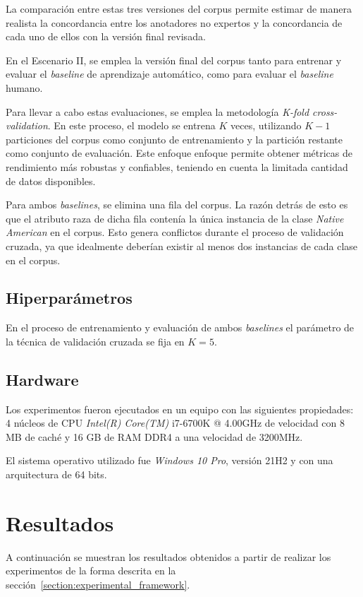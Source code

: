 La comparaci\'on entre estas tres versiones del corpus permite estimar de manera realista la concordancia entre los anotadores 
no expertos y la concordancia de cada uno de ellos con la versi\'on final revisada. 

En el Escenario II, se emplea la versi\'on final del corpus tanto para entrenar y evaluar el \emph{baseline} de aprendizaje 
autom\'atico, como para evaluar el \emph{baseline} humano.

Para llevar a cabo estas evaluaciones, se emplea la 
metodolog\'ia \emph{K-fold cross-validation}. En este proceso, el modelo se entrena $K$ veces, utilizando 
$K-1$ particiones del corpus como conjunto de entrenamiento y la partici\'on restante como conjunto de evaluaci\'on.
Este enfoque enfoque permite obtener m\'etricas de rendimiento m\'as robustas y confiables, teniendo en cuenta 
la limitada cantidad de datos disponibles.

Para ambos \emph{baselines}, se elimina una fila del corpus. La raz\'on detr\'as de esto es que el atributo raza de dicha 
fila conten\'ia la \'unica instancia de la clase \emph{Native American} en el corpus. 
Esto genera conflictos durante el proceso de validaci\'on cruzada, ya que idealmente deber\'ian existir al menos dos 
instancias de cada clase en el corpus.

\subsection{Hiperpar\'ametros}
En el proceso de entrenamiento y evaluaci\'on de ambos \emph{baselines} el par\'ametro de la t\'ecnica de validaci\'on
cruzada se fija en $K=5$. 

\subsection{Hardware}
Los experimentos fueron ejecutados en un equipo con las siguientes propiedades: 4 n\'ucleos de CPU \emph{Intel(R) Core(TM)} i7-6700K
@ 4.00GHz de velocidad con 8 MB de cach\'e y 16 GB de RAM DDR4 a una velocidad de 3200MHz.

El sistema operativo utilizado fue \emph{Windows 10 Pro}, versi\'on 21H2 y con una arquitectura de 64 bits.

\section{Resultados}\label{section:results}
A continuaci\'on se muestran los resultados obtenidos a partir de realizar los experimentos de la forma descrita en la 
secci\'on~\ref{section:experimental_framework}.

